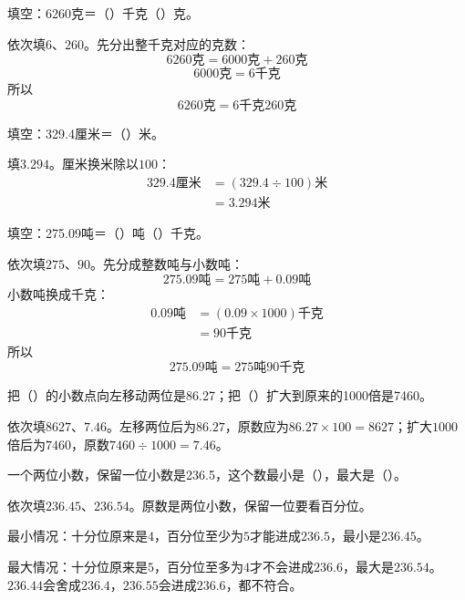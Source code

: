 填空：6260克＝（\hspace{1.8em}）千克（\hspace{1.8em}）克。\par
\begin{BookAnswer}
依次填\(6\)、\(260\)。先分出整千克对应的克数：\[6260\text{克}=6000\text{克}+260\text{克}\]\[6000\text{克}=6\text{千克}\]所以\[6260\text{克}=6\text{千克}260\text{克}\]
\end{BookAnswer}

填空：329.4厘米＝（\hspace{1.8em}）米。\par
\begin{BookAnswer}
填\(3.294\)。厘米换米除以\(100\)：\[\begin{aligned}329.4\text{厘米}&=(329.4\div100)\text{米}\\&=3.294\text{米}\end{aligned}\]
\end{BookAnswer}

填空：275.09吨＝（\hspace{1.8em}）吨（\hspace{1.8em}）千克。\par
\begin{BookAnswer}
依次填\(275\)、\(90\)。先分成整数吨与小数吨：\[275.09\text{吨}=275\text{吨}+0.09\text{吨}\]小数吨换成千克：\[\begin{aligned}0.09\text{吨}&=(0.09\times1000)\text{千克}\\&=90\text{千克}\end{aligned}\]所以\[275.09\text{吨}=275\text{吨}90\text{千克}\]
\end{BookAnswer}

把（\hspace{1.8em}）的小数点向左移动两位是86.27；把（\hspace{1.8em}）扩大到原来的1000倍是7460。\par
\begin{BookAnswer}
依次填\(8627\)、\(7.46\)。左移两位后为\(86.27\)，原数应为\(86.27\times100=8627\)；扩大\(1000\)倍后为\(7460\)，原数\(7460\div1000=7.46\)。
\end{BookAnswer}

一个两位小数，保留一位小数是236.5，这个数最小是（\hspace{1.8em}），最大是（\hspace{1.8em}）。\par
\begin{BookAnswer}
依次填\(236.45\)、\(236.54\)。原数是两位小数，保留一位要看百分位。\par 最小情况：十分位原来是\(4\)，百分位至少为\(5\)才能进成\(236.5\)，最小是\(236.45\)。\par 最大情况：十分位原来是\(5\)，百分位至多为\(4\)才不会进成\(236.6\)，最大是\(236.54\)。\(236.44\)会舍成\(236.4\)，\allowbreak{}\(236.55\)会进成\(236.6\)，都不符合。
\end{BookAnswer}


